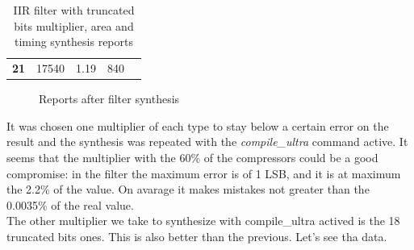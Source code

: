 \documentclass[a4paper]{article}
\begin{document}
\begin{table}[hbtp]
\begin{tabular}{|c|c|c|c|l}
		\textbf{21}                                                                  & 		17540                                                                      & 		1.19                                                                       & 		840                                                                                  &  \\ \cline{1-4}
		\end{tabular}
		\caption{IIR filter with truncated bits multiplier, area and timing synthesis reports}
		\label{tab:iir_trunc_syn}
	\end{table}

	\begin{figure}[H]
			\centering
			\hfill
			\caption{Reports after filter synthesis}
		\end{figure}

	It was chosen one multiplier of each type to stay below a certain error on the result and the synthesis was repeated with the \textit{compile\_ultra} command active. It seems that the multiplier with the 60\% of the compressors could be a good compromise: in the filter the maximum error is of 1 LSB, and it is at maximum the 2.2\% of the value. On avarage it makes mistakes not greater than the 0.0035\% of the real value.\\
	The other multiplier we take to synthesize with compile\_ultra actived is the 18 truncated bits ones. This is also better than the previous. Let's see tha data.
\end{document}
